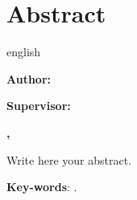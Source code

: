 \chapter*{Abstract}
 \begin{otherlanguage*}{english}

\vspace{\onelineskip}

\noindent \textbf{\MakeUppercase\imprimirtituloen}

\vspace{5mm}

\noindent \textbf{Author: \imprimirautor}

\noindent \textbf{Supervisor: \imprimirorientador}

\noindent \textbf{\imprimircourse}

\noindent \textbf{\imprimirlocal, \imprimirano}

\vspace{5mm}
\noindent
Write here your abstract.

\vspace{5mm}
\noindent 
\textbf{Key-words}: .

\end{otherlanguage*}